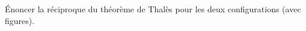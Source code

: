 \documentclass[exercice]{thedocument}%
\begin{document}
%
    Énoncer la réciproque du théorème de Thalès pour les deux configurations
    (avec figures).
\end{document}
